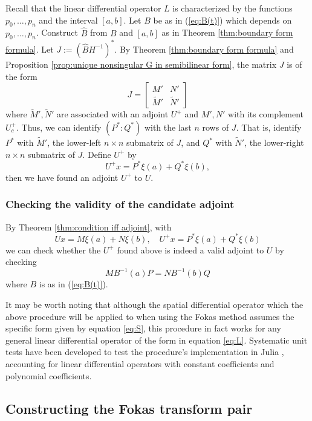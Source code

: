 \documentclass[12pt, oneside, a4paper]{article}
\begin{document}
Recall that the linear differential operator $L$ is characterized by the functions $p_0,\ldots,p_n$ and the interval $[a,b]$. Let $B$ be as in (\ref{eq:B(t)}) which depends on $p_0,\ldots,p_n$. Construct $\widehat{B}$ from $B$ and $[a,b]$ as in Theorem \ref{thm:boundary form formula}. Let $J:=(\widehat{B}H^{-1})^*$. By Theorem \ref{thm:boundary form formula} and Proposition \ref{prop:unique nonsingular G in semibilinear form}, the matrix $J$ is of the form
\[J=\begin{bmatrix}M' & N'\\ \tilde{M}' & \tilde{N}'\end{bmatrix}\]
where $\tilde{M}', \tilde{N}'$ are associated with an adjoint $U^+$ and $M', N'$ with its complement $U_c^+$.
Thus, we can identify $(P^*:Q^*)$ with the last $n$ rows of $J$. That is, identify $P^*$ with $\tilde{M}'$, the lower-left $n\times n$ submatrix of $J$, and $Q^*$ with $\tilde{N}'$, the lower-right $n\times n$ submatrix of $J$. Define $U^+$ by
\[U^+x = P^* \xi(a) + Q^* \xi(b),\]
then we have found an adjoint $U^+$ to $U$.

\subsubsection{Checking the validity of the candidate adjoint}
By Theorem \ref{thm:condition iff adjoint}, with
\begin{equation}\label{eq:adjointU}
    Ux = M\xi(a) + N\xi(b),\quad U^+x = P^* \xi(a) + Q^* \xi(b)
\end{equation}
we can check whether the $U^+$ found above is indeed a valid adjoint to $U$ by checking 
\[MB^{-1}(a)P = NB^{-1}(b)Q\]
where $B$ is as in (\ref{eq:B(t)}).

It may be worth noting that although the spatial differential operator which the above procedure will be applied to when using the Fokas method assumes the specific form given by equation \eqref{eq:S}, this procedure in fact works for any general linear differential operator of the form in equation \eqref{eq:L}. Systematic unit tests have been developed to test the procedure's implementation in Julia \cite{Xiao}, accounting for linear differential operators with constant coefficients and polynomial coefficients.

\subsection{Constructing the Fokas transform pair}\label{sec:fokas_transform_pair}
\end{document}
